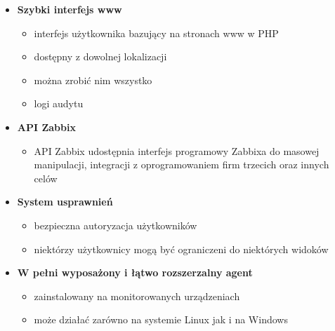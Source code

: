 \documentclass[12pt]{article}
\renewcommand{\_}{\kern-1.5pt\textunderscore\kern-1.5pt}
\begin{document}
\begin{itemize}
\begin{itemize}
\begin{itemize}
\begin{itemize}
\end{itemize}
	\item \textbf{Szybki interfejs www}\par

\begin{itemize}
	\item interfejs użytkownika bazujący na stronach www w PHP\par

	\item dostępny z dowolnej lokalizacji\par

	\item można zrobić nim wszystko\par

	\item logi audytu\par


\end{itemize}
	\item \textbf{API Zabbix}\par

\begin{itemize}
	\item API Zabbix udostępnia interfejs programowy Zabbixa do masowej manipulacji, integracji z oprogramowaniem firm trzecich oraz innych celów\par


\end{itemize}
	\item \textbf{System usprawnień}\par

\begin{itemize}
	\item bezpieczna autoryzacja użytkowników\par

	\item niektórzy użytkownicy mogą być ograniczeni do niektórych widoków\par


\end{itemize}
	\item \textbf{W pełni wyposażony i łątwo rozszerzalny agent}\par

\begin{itemize}
	\item zainstalowany na monitorowanych urządzeniach\par

	\item może działać zarówno na systemie Linux jak i na Windows\par



\end{itemize}
\end{itemize}
\end{itemize}
\end{itemize}
\end{document}

